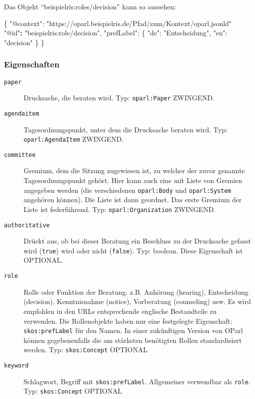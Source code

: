 \documentclass[,a4paper]{article}
\newenvironment{Shaded}{}{}
\newcommand{\DataTypeTok}[1]{\textcolor[rgb]{0.56,0.13,0.00}{{#1}}}
\newcommand{\StringTok}[1]{\textcolor[rgb]{0.25,0.44,0.63}{{#1}}}
\newcommand{\FunctionTok}[1]{\textcolor[rgb]{0.02,0.16,0.49}{{#1}}}
\newcommand{\ErrorTok}[1]{\textcolor[rgb]{1.00,0.00,0.00}{\textbf{{#1}}}}
\begin{document}
Das Objekt ``beispielris:roles/decision'' kann so aussehen:

\begin{Shaded}
\begin{Highlighting}[]
\FunctionTok{\{}
    \DataTypeTok{"@context"}\FunctionTok{:} \StringTok{"https://oparl.beispielris.de/Pfad/zum/Kontext/oparl.jsonld"}
    \StringTok{"@id"}\ErrorTok{:} \StringTok{"beispielris:role/decision"}\FunctionTok{,}
    \DataTypeTok{"prefLabel"}\FunctionTok{:} \FunctionTok{\{}
        \DataTypeTok{"de"}\FunctionTok{:} \StringTok{"Entscheidung"}\FunctionTok{,}
        \DataTypeTok{"en"}\FunctionTok{:} \StringTok{"decision"}
    \FunctionTok{\}}
\FunctionTok{\}}
\end{Highlighting}
\end{Shaded}

\subsubsection{Eigenschaften}\label{eigenschaften-8}

\begin{description}
\item[\texttt{paper}]
Drucksache, die beraten wird. Typ: \texttt{oparl:Paper} ZWINGEND.
\item[\texttt{agendaitem}]
Tagesordnungspunkt, unter dem die Drucksache beraten wird. Typ:
\texttt{oparl:AgendaItem} ZWINGEND.
\item[\texttt{committee}]
Gremium, dem die Sitzung zugewiesen ist, zu welcher der zuvor genannte
Tagesordnungspunkt gehört. Hier kann auch eine mit Liste von Gremien
angegeben werden (die verschiedenen \texttt{oparl:Body} und
\texttt{oparl:System} angehören können). Die Liste ist dann geordnet.
Das erste Gremium der Liste ist federführend. Typ:
\texttt{oparl:Organization} ZWINGEND.
\item[\texttt{authoritative}]
Drückt aus, ob bei dieser Beratung ein Beschluss zu der Drucksache
gefasst wird (\texttt{true}) wird oder nicht (\texttt{false}). Typ:
boolean. Diese Eigenschaft ist OPTIONAL.
\item[\texttt{role}]
Rolle oder Funktion der Beratung. z.B. Anhörung (hearing), Entscheidung
(decision), Kenntnisnahme (notice), Vorberatung (counseling) usw. Es
wird empfohlen in den URLs entsprechende englische Bestandteile zu
verwenden. Die Rollenobjekte haben nur eine festgelegte Eigenschaft:
\texttt{skos:prefLabel} für den Namen. In einer zukünftigen Version von
OParl können gegebenenfalls die am stärksten benötigten Rollen
standardisiert werden. Typ: \texttt{skos:Concept} OPTIONAL
\item[\texttt{keyword}]
Schlagwort, Begriff mit \texttt{skos:prefLabel}. Allgemeiner verwendbar
als \texttt{role}. Typ: \texttt{skos:Concept} OPTIONAL
\end{description}
\end{document}

